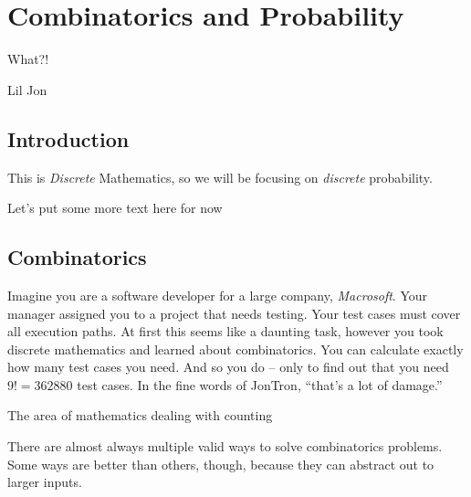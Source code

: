 \documentclass[main.tex]{subfiles}
\begin{document}
\chapter{Combinatorics and Probability}

\epigraph{What?!}{Lil Jon}

\minitoc

\section{Introduction}

This is \textit{Discrete} Mathematics, so we will be focusing on \textit{discrete} probability.

Let's put some more text here for now

\section{Combinatorics}

Imagine you are a software developer for a large company, \textit{Macrosoft}. Your manager assigned you to a project that needs testing. Your test cases must cover all execution paths. At first this seems like a daunting task, however you took discrete mathematics and learned about combinatorics. You can calculate exactly how many test cases you need. And so you do -- only to find out that you need \(9! = 362880\) test cases. In the fine words of JonTron, ``that's a lot of damage.''

\begin{defn}
	The area of mathematics dealing with counting
\end{defn}


\begin{rem}
	There are almost always multiple valid ways to solve combinatorics problems. Some ways are better than others, though, because they can abstract out to larger inputs.
\end{rem}
\end{document}
